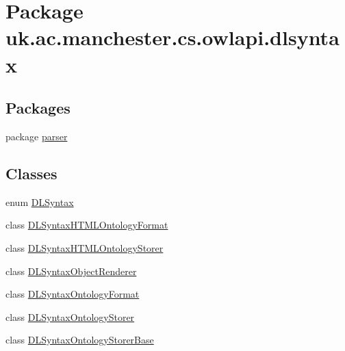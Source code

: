 \hypertarget{namespaceuk_1_1ac_1_1manchester_1_1cs_1_1owlapi_1_1dlsyntax}{\section{Package uk.\-ac.\-manchester.\-cs.\-owlapi.\-dlsyntax}
\label{namespaceuk_1_1ac_1_1manchester_1_1cs_1_1owlapi_1_1dlsyntax}
}
\subsection*{Packages}
\begin{DoxyCompactItemize}
\item 
package \hyperlink{namespaceuk_1_1ac_1_1manchester_1_1cs_1_1owlapi_1_1dlsyntax_1_1parser}{parser}
\end{DoxyCompactItemize}
\subsection*{Classes}
\begin{DoxyCompactItemize}
\item 
enum \hyperlink{enumuk_1_1ac_1_1manchester_1_1cs_1_1owlapi_1_1dlsyntax_1_1_d_l_syntax}{D\-L\-Syntax}
\item 
class \hyperlink{classuk_1_1ac_1_1manchester_1_1cs_1_1owlapi_1_1dlsyntax_1_1_d_l_syntax_h_t_m_l_ontology_format}{D\-L\-Syntax\-H\-T\-M\-L\-Ontology\-Format}
\item 
class \hyperlink{classuk_1_1ac_1_1manchester_1_1cs_1_1owlapi_1_1dlsyntax_1_1_d_l_syntax_h_t_m_l_ontology_storer}{D\-L\-Syntax\-H\-T\-M\-L\-Ontology\-Storer}
\item 
class \hyperlink{classuk_1_1ac_1_1manchester_1_1cs_1_1owlapi_1_1dlsyntax_1_1_d_l_syntax_object_renderer}{D\-L\-Syntax\-Object\-Renderer}
\item 
class \hyperlink{classuk_1_1ac_1_1manchester_1_1cs_1_1owlapi_1_1dlsyntax_1_1_d_l_syntax_ontology_format}{D\-L\-Syntax\-Ontology\-Format}
\item 
class \hyperlink{classuk_1_1ac_1_1manchester_1_1cs_1_1owlapi_1_1dlsyntax_1_1_d_l_syntax_ontology_storer}{D\-L\-Syntax\-Ontology\-Storer}
\item 
class \hyperlink{classuk_1_1ac_1_1manchester_1_1cs_1_1owlapi_1_1dlsyntax_1_1_d_l_syntax_ontology_storer_base}{D\-L\-Syntax\-Ontology\-Storer\-Base}
\end{DoxyCompactItemize}
